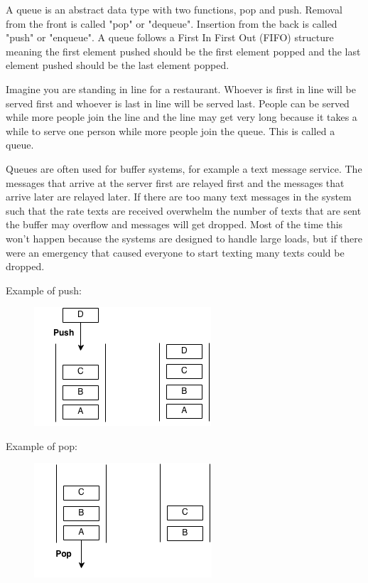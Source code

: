 \documentclass[11pt,oneside]{book}
\makeatletter
\def\maxwidth#1{\ifdim\Gin@nat@width>#1 #1\else\Gin@nat@width\fi}
\makeatother
\begin{document}
A queue is an abstract data type with two functions, pop and push. Removal from the front is called "pop" or "dequeue". Insertion from the back is called "push" or "enqueue". A queue follows a First In First Out (FIFO) structure meaning the first element pushed should be the first element popped and the last element pushed should be the last element popped.

Imagine you are standing in line for a restaurant. Whoever is first in line will be served first and whoever is last in line will be served last. People can be served while more people join the line and the line may get very long because it takes a while to serve one person while more people join the queue. This is called a queue.

Queues are often used for buffer systems, for example a text message service. The messages that arrive at the server first are relayed first and the messages that arrive later are relayed later. If there are too many text messages in the system such that the rate  texts are received overwhelm the number of texts that are sent the buffer may overflow and messages will get dropped. Most of the time this won't happen because the systems are designed to handle large loads, but if there were an emergency that caused everyone to start texting many texts could be dropped.

Example of push:

\vspace{5px}\begin{figure}[H]\centering
        \includegraphics[width=0.66\maxwidth{\textwidth}]{queue.png}
        \end{figure}

Example of pop:

\vspace{5px}\begin{figure}[H]\centering
        \includegraphics[width=0.66\maxwidth{\textwidth}]{queue2.png}
        \end{figure}
\end{document}
